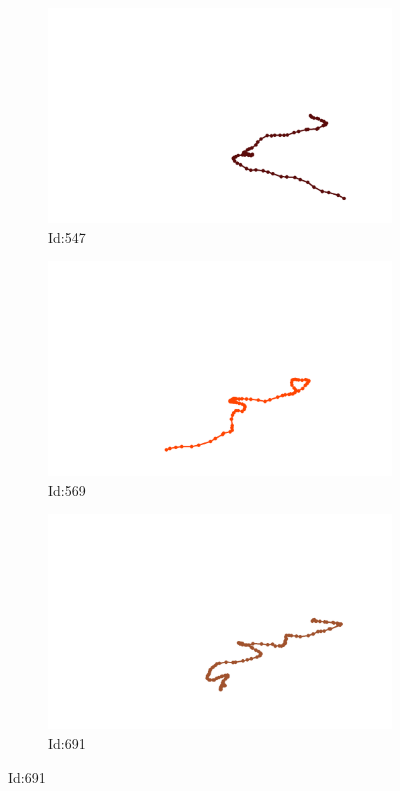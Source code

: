 \documentclass[12pt,twoside]{report}
\begin{document}
\begin{figure}
\centering
\begin{subfigure}[b]{0.20\textwidth}
\centering
\includegraphics[width=\textwidth]{../../trajectories/547.png}
\caption{Id:547}
\end{subfigure}
\begin{subfigure}[b]{0.20\textwidth}
\centering
\includegraphics[width=\textwidth]{../../trajectories/569.png}
\caption{Id:569}
\end{subfigure}
\begin{subfigure}[b]{0.20\textwidth}
\centering
\includegraphics[width=\textwidth]{../../trajectories/691.png}
\caption{Id:691}
\end{subfigure}
\end{figure}
\end{document}
